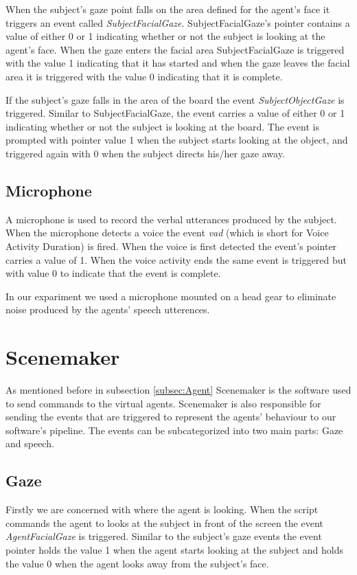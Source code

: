 \documentclass[12pt, a4paper, fleqn]{memoir}%
\begin{document}
When the subject's gaze point falls on the area defined for the agent's face it triggers an event called \textit{SubjectFacialGaze}. SubjectFacialGaze's pointer contains a value of either 0 or 1 indicating whether or not the subject is looking at the agent's face. When the gaze enters the facial area SubjectFacialGaze is triggered with the value 1 indicating that it has started and when the gaze leaves the facial area it is triggered with the value 0 indicating that it is complete.

If the subject's gaze falls in the area of the board the event \textit{SubjectObjectGaze} is triggered. Similar to SubjectFacialGaze, the event carries a value of either 0 or 1 indicating whether or not the subject is looking at the board. The event is prompted with pointer value 1 when the subject starts looking at the object, and triggered again with 0 when the subject directs his/her gaze away.

\subsection{Microphone}
A microphone is used to record the verbal utterances produced by the subject. When the microphone detects a voice the event \textit{vad} (which is short for Voice Activity Duration) is fired. When the voice is first detected the event's pointer carries a value of 1. When the voice activity ends the same event is triggered but with value 0 to indicate that the event is complete.

In our expariment we used a microphone mounted on a head gear to eliminate noise produced by the agents' speech utterences.

\section{Scenemaker}
\label{sec:Scenemaker}
As mentioned before in subsection \ref{subsec:Agent} Scenemaker is the software used to send commands to the virtual agents. Scenemaker is also responsible for sending the events that are triggered to represent the agents' behaviour to our software's pipeline. The events can be subcategorized into two main parts: Gaze and speech.

\subsection{Gaze}
Firstly we are concerned with where the agent is looking. When the script commands the agent to looks at the subject in front of the screen the event \textit{AgentFacialGaze} is triggered. Similar to the subject's gaze events the event pointer holds the value 1 when the agent starts looking at the subject and holds the value 0 when the agent looks away from the subject's face.
\end{document}
